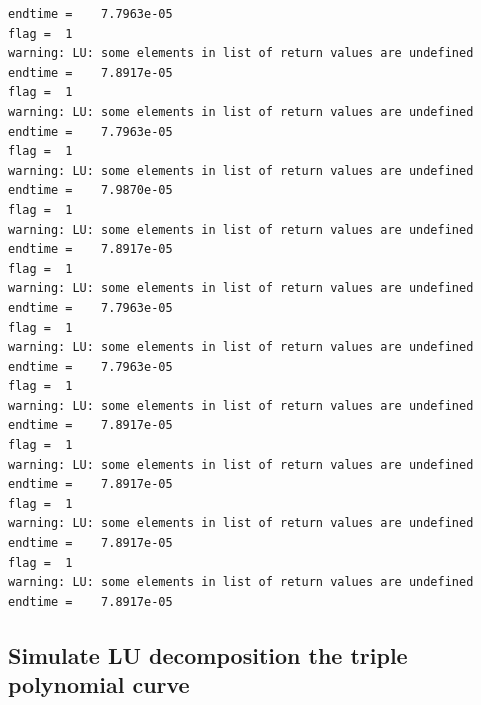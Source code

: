 \documentclass[10pt]{article}
\begin{document}
\begin{lstlisting}[language={},xleftmargin=5pt,frame=none]
endtime =    7.7963e-05
flag =  1
warning: LU: some elements in list of return values are undefined
endtime =    7.8917e-05
flag =  1
warning: LU: some elements in list of return values are undefined
endtime =    7.7963e-05
flag =  1
warning: LU: some elements in list of return values are undefined
endtime =    7.9870e-05
flag =  1
warning: LU: some elements in list of return values are undefined
endtime =    7.8917e-05
flag =  1
warning: LU: some elements in list of return values are undefined
endtime =    7.7963e-05
flag =  1
warning: LU: some elements in list of return values are undefined
endtime =    7.7963e-05
flag =  1
warning: LU: some elements in list of return values are undefined
endtime =    7.8917e-05
flag =  1
warning: LU: some elements in list of return values are undefined
endtime =    7.8917e-05
flag =  1
warning: LU: some elements in list of return values are undefined
endtime =    7.8917e-05
flag =  1
warning: LU: some elements in list of return values are undefined
endtime =    7.8917e-05

\end{lstlisting}


{}
\subsection*{Simulate LU decomposition the triple polynomial curve}
\end{document}
